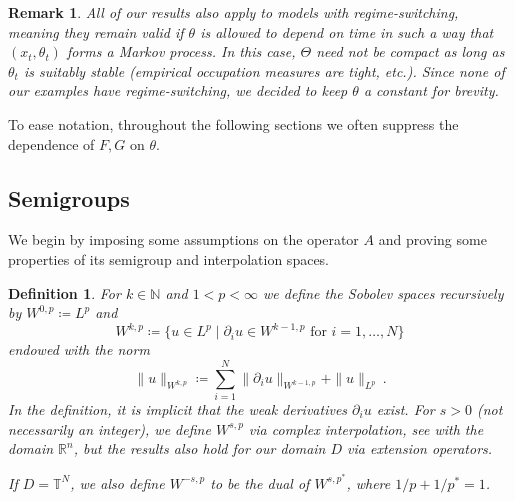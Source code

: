 \documentclass[final]{amsart}
\newtheorem{deff}[thm]{Definition}
\newtheorem{rem}[thm]{Remark}
\numberwithin{thm}{section}
\numberwithin{equation}{section}
\newcommand{\N}{\mathbb{N}}
\newcommand{\R}{\mathbb{R}}
\newcommand{\T}{\mathbb{T}}
\begin{document}
\begin{rem}\label{we-can-also-handle-switching}
    All of our results also apply to models with regime-switching, meaning they remain valid if $\theta$ is allowed to depend on time in such a way that $(x_t,\theta_t)$ forms a Markov process. In this case, $\Theta$ need not be compact as long as $\theta_t$ is suitably stable (empirical occupation measures are tight, etc.). Since none of our examples have regime-switching, we decided to keep $\theta$ a constant  for brevity.
\end{rem}

To ease notation, throughout the following sections we often suppress the dependence of $F,G$ on $\theta$.

\subsection{Semigroups}\label{SPDE-setup}
We begin by imposing some assumptions on the operator $A$ and proving some properties of its semigroup and interpolation spaces.

\begin{deff}\label{sobolev-spaces}
    For $k \in \N$ and $1 < p < \infty$ we define the Sobolev spaces recursively by $W^{0,p} \coloneqq L^p$ and
    $$W^{k,p} \coloneqq \{u \in L^p \mid \partial_iu \in W^{k-1,p} \text{ for } i = 1,\dots, N\}$$
    endowed with the norm
    $$\|u\|_{W^{k,p}} \coloneqq \sum_{i=1}^N\|\partial_i u\|_{W^{k-1,p}} + \|u\|_{L^p} \,.$$
    In the definition, it is implicit that the weak derivatives $\partial_i u$ exist. For $s > 0$ (not necessarily an integer), we define $W^{s,p}$ via complex interpolation, see \cite[Theorem 6.4.5 (7)]{interpolation-simple} with the domain $\R^n$, but the results also hold for our domain $D$ via extension operators.

    If $D = \T^N$, we also define $W^{-s,p}$ to be the dual of $W^{s,p^*}$, where $1/p + 1/p^* = 1$.
\end{deff}
\end{document}
